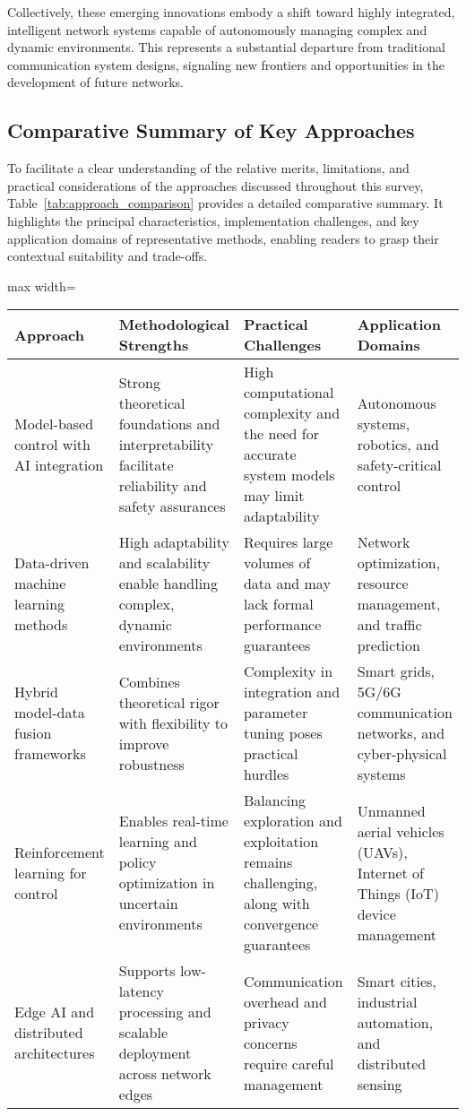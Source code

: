 \documentclass[sigconf]{acmart}
\begin{document}
Collectively, these emerging innovations embody a shift toward highly integrated, intelligent network systems capable of autonomously managing complex and dynamic environments. This represents a substantial departure from traditional communication system designs, signaling new frontiers and opportunities in the development of future networks.

\subsection{Comparative Summary of Key Approaches}

To facilitate a clear understanding of the relative merits, limitations, and practical considerations of the approaches discussed throughout this survey, Table~\ref{tab:approach_comparison} provides a detailed comparative summary. It highlights the principal characteristics, implementation challenges, and key application domains of representative methods, enabling readers to grasp their contextual suitability and trade-offs.

\begin{table*}[htbp]
\centering
\caption{Comparative summary of key AI-based control and wireless methodologies}
\label{tab:approach_comparison}
\begin{adjustbox}{max width=\textwidth}
\begin{tabular}{@{}llll@{}}
\toprule
Approach & Methodological Strengths & Practical Challenges & Application Domains \\
\midrule
Model-based control with AI integration & Strong theoretical foundations and interpretability facilitate reliability and safety assurances & High computational complexity and the need for accurate system models may limit adaptability & Autonomous systems, robotics, and safety-critical control \\
Data-driven machine learning methods & High adaptability and scalability enable handling complex, dynamic environments & Requires large volumes of data and may lack formal performance guarantees & Network optimization, resource management, and traffic prediction \\
Hybrid model-data fusion frameworks & Combines theoretical rigor with flexibility to improve robustness & Complexity in integration and parameter tuning poses practical hurdles & Smart grids, 5G/6G communication networks, and cyber-physical systems \\
Reinforcement learning for control & Enables real-time learning and policy optimization in uncertain environments & Balancing exploration and exploitation remains challenging, along with convergence guarantees & Unmanned aerial vehicles (UAVs), Internet of Things (IoT) device management \\
Edge AI and distributed architectures & Supports low-latency processing and scalable deployment across network edges & Communication overhead and privacy concerns require careful management & Smart cities, industrial automation, and distributed sensing \\
\bottomrule
\end{tabular}
\end{adjustbox}
\end{table*}
\end{document}
